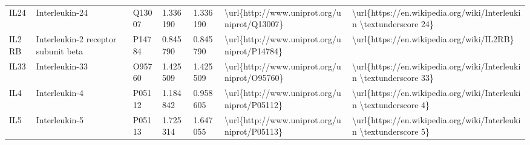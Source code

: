 \begin{table}[]
\begin{tabular}{lllllll}
\multicolumn{1}{l|}{IL24}     & Interleukin-24                                                & Q13007  & 1.336190           & 1.336190          & \textbackslash{}url\{http://www.uniprot.org/uniprot/Q13007\} & \textbackslash{}url\{https://en.wikipedia.org/wiki/Interleukin \textbackslash{}textunderscore 24\}                                                                                                                                                                                                 \\
\multicolumn{1}{l|}{IL2RB}    & Interleukin-2 receptor subunit beta                           & P14784  & 0.845790           & 0.845790          & \textbackslash{}url\{http://www.uniprot.org/uniprot/P14784\} & \textbackslash{}url\{https://en.wikipedia.org/wiki/IL2RB\}                                                                                                                                                                                                                                         \\
\multicolumn{1}{l|}{IL33}     & Interleukin-33                                                & O95760  & 1.425509           & 1.425509          & \textbackslash{}url\{http://www.uniprot.org/uniprot/O95760\} & \textbackslash{}url\{https://en.wikipedia.org/wiki/Interleukin \textbackslash{}textunderscore 33\}                                                                                                                                                                                                 \\
\multicolumn{1}{l|}{IL4}      & Interleukin-4                                                 & P05112  & 1.184842           & 0.958605          & \textbackslash{}url\{http://www.uniprot.org/uniprot/P05112\} & \textbackslash{}url\{https://en.wikipedia.org/wiki/Interleukin \textbackslash{}textunderscore 4\}                                                                                                                                                                                                  \\
\multicolumn{1}{l|}{IL5}      & Interleukin-5                                                 & P05113  & 1.725314           & 1.647055          & \textbackslash{}url\{http://www.uniprot.org/uniprot/P05113\} & \textbackslash{}url\{https://en.wikipedia.org/wiki/Interleukin \textbackslash{}textunderscore 5\}                                                                                                                                                                                                  \\

\end{tabular}
\end{table}
